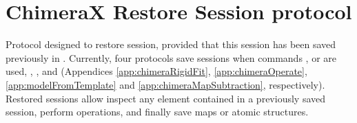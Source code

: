 \section{ChimeraX Restore Session protocol}
\label{app:chimeraRestoreSession}%

Protocol designed to restore \chimera session, provided that this session has been saved previously in \scipion. Currently, four protocols save \chimera sessions when \chimera commands ,  or  are used, , ,  and  (Appendices \ref{app:chimeraRigidFit}, \ref{app:chimeraOperate}, \ref{app:modelFromTemplate} and \ref{app:chimeraMapSubtraction}, respectively). Restored sessions allow inspect any element contained in a previously saved \chimera session, perform \chimera operations, and finally save maps or atomic structures.

